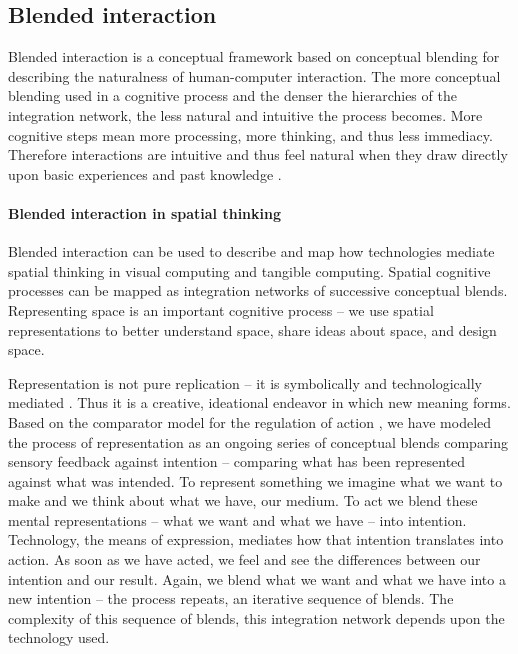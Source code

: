 \documentclass{article}
\begin{document}
\subsection{Blended interaction}
Blended interaction is a conceptual framework based on conceptual blending for describing the naturalness of human-computer interaction. 
The more conceptual blending used in a cognitive process and the denser the hierarchies of the integration network, the less natural and intuitive the process becomes. More cognitive steps mean more processing, more thinking, and thus less immediacy. 
Therefore interactions are intuitive and thus feel natural when they draw directly upon basic experiences and past knowledge \citep{Jetter2014}.

\paragraph{Blended interaction in spatial thinking}
Blended interaction can be used to describe and map %
how technologies mediate spatial thinking in visual computing and tangible computing. 
Spatial cognitive processes can be mapped as integration networks of successive conceptual blends. 
Representing space is an important cognitive process -- we use spatial representations to better understand space, share ideas about space, and design space. 

Representation is not pure replication -- it is symbolically \citep{Deacon2006} and technologically mediated \citep{Donald2006}. Thus it is a creative, ideational endeavor in which new meaning forms. 
Based on the comparator model for the regulation of action \citep{Jeannerod1997}, %
we have modeled the process of representation as an ongoing series of conceptual blends comparing sensory feedback against intention -- comparing what has been represented against what was intended. 
To represent something we imagine what we want to make and we think about what we have, our medium. To act we blend these mental representations -- what we want and what we have -- into intention. Technology, the means of expression, mediates how that intention translates into action. As soon as we have acted, we feel and see the differences between our intention and our result. Again, we blend what we want and what we have into a new intention -- the process repeats, an iterative sequence of blends. The complexity of this sequence of blends, this integration network depends upon the technology used. 
\end{document}

